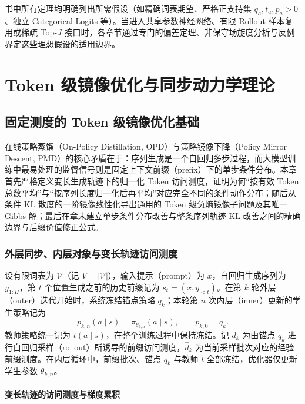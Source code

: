 \documentclass[lang=cn,scheme=chinese,openany]{elegantbook}
\begin{document}
书中所有定理均明确列出所需假设（如精确词表期望、严格正支持集 $q_a,t_a,p_a>0$、独立 Categorical Logits 等）。当进入共享参数神经网络、有限 Rollout 样本复用或稀疏 Top-$J$ 接口时，各章节通过专门的偏差定理、非保守场旋度分析与反例界定这些理想假设的适用边界。

\tableofcontents
\mainmatter

\part{Token 级镜像优化与同步动力学理论}

\chapter{固定测度的 Token 级镜像优化基础}
\label{ch:foundations}

在线策略蒸馏（On-Policy Distillation, OPD）与策略镜像下降（Policy Mirror Descent, PMD）的核心矛盾在于：序列生成是一个自回归多步过程，而大模型训练中最易处理的监督信号则是固定上下文前缀（prefix）下的单步条件分布。本章首先严格定义变长生成轨迹下的归一化 Token 访问测度，证明为何“按有效 Token 总数平均”与“按序列长度归一化后再平均”对应完全不同的条件动作分布；随后从条件 KL 散度的一阶镜像线性化导出通用的 Token 级负熵镜像子问题及其唯一 Gibbs 解；最后在章末建立单步条件分布改善与整条序列轨迹 KL 改善之间的精确边界与后缀价值修正公式。

\section{外层同步、内层对象与变长轨迹访问测度}

设有限词表为 $\mathcal V$（记 $V=|\mathcal V|$），输入提示（prompt）为 $x$，自回归生成序列为 $y_{1:H}$，第 $t$ 个位置生成之前的历史前缀记为 $s_t=(x,y_{<t})$。在第 $k$ 轮外层（outer）迭代开始时，系统冻结锚点策略 $q_k$；本轮第 $n$ 次内层（inner）更新的学生策略记为
\begin{equation}
 p_{k,n}(a\mid s)=\pi_{\theta_{k,n}}(a\mid s),
\qquad  p_{k,0}= q_k.
\end{equation}
教师策略统一记为 $t(a\mid s)$，在整个训练过程中保持冻结。记 $d_k$ 为由锚点 $q_k$ 进行自回归采样（rollout）所诱导的前缀访问测度，$\widehat d_k$ 为当前采样批次对应的经验前缀测度。在内层循环中，前缀批次、锚点 $q_k$ 与教师 $t$ 全部冻结，优化器仅更新学生参数 $\theta_{k,n}$。

\subsection{变长轨迹的访问测度与梯度累积}
\label{sec:prefix-measure-reduction}
\end{document}
